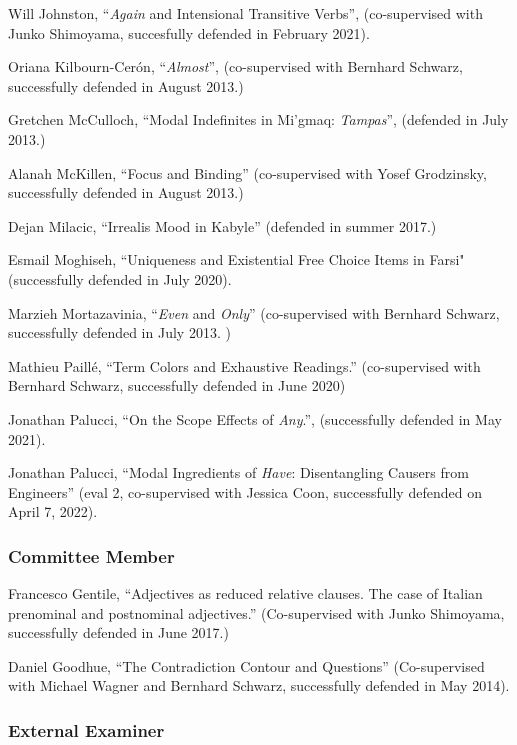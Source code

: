 \documentclass[11pt]{article}
\begin{document}
Will Johnston, ``\textit{Again} and Intensional Transitive Verbs'', (co-supervised with Junko Shimoyama, succesfully defended in February 2021).

Oriana Kilbourn-Cer\'on, ``\textit{Almost}'', (co-supervised with Bernhard Schwarz,
successfully defended in August 2013.) 

Gretchen McCulloch, ``Modal Indefinites in Mi'gmaq: \textit{Tampas}'', (defended in July 2013.)

Alanah McKillen, ``Focus and Binding'' (co-supervised with Yosef
Grodzinsky, successfully defended in August 2013.)

Dejan Milacic, ``Irrealis Mood in Kabyle'' (defended in summer 2017.)

Esmail Moghiseh, ``Uniqueness and Existential Free Choice Items in Farsi" (successfully defended in July 2020).

Marzieh Mortazavinia, ``\textit{Even} and \textit{Only}''
(co-supervised with Bernhard Schwarz, successfully defended in July
2013. )

Mathieu Paill\'e, ``Term Colors and Exhaustive Readings.'' (co-supervised with Bernhard Schwarz, successfully defended in June 2020)

Jonathan Palucci, ``On the Scope Effects of \textit{Any}.'', (successfully defended in May 2021).

Jonathan Palucci, ``Modal Ingredients of \textit{Have}: Disentangling Causers from Engineers'' (eval 2, co-supervised with Jessica Coon, successfully defended on April 7, 2022).





\subsubsection*{Committee Member}


Francesco Gentile,  ``Adjectives as reduced relative clauses. The case of Italian prenominal and postnominal adjectives.'' (Co-supervised with Junko Shimoyama, successfully defended in June 2017.)

Daniel Goodhue, ``The Contradiction Contour and Questions''
(Co-supervised with Michael Wagner and Bernhard Schwarz, successfully
defended in May 2014).

\subsubsection*{External Examiner}
\end{document}
